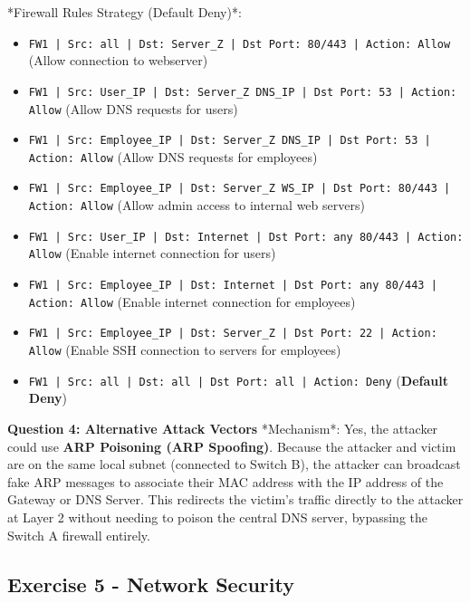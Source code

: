 \documentclass{article}
\begin{document}
*Firewall Rules Strategy (Default Deny)*:
\begin{itemize}
    \item[\textbf{1.}] \texttt{FW1 | Src: all | Dst: Server\_Z | Dst Port: 80/443 | Action: Allow} (Allow connection to webserver)
    \item[\textbf{2.}] \texttt{FW1 | Src: User\_IP | Dst: Server\_Z DNS\_IP | Dst Port: 53 | Action: Allow} (Allow DNS requests for users)
    \item[\textbf{3.}] \texttt{FW1 | Src: Employee\_IP | Dst: Server\_Z DNS\_IP | Dst Port: 53 | Action: Allow} (Allow DNS requests for employees)
    \item[\textbf{4.}] \texttt{FW1 | Src: Employee\_IP | Dst: Server\_Z WS\_IP | Dst Port: 80/443 | Action: Allow} (Allow admin access to internal web servers)
    \item[\textbf{5.}] \texttt{FW1 | Src: User\_IP | Dst: Internet | Dst Port: any 80/443 | Action: Allow} (Enable internet connection for users)
    \item[\textbf{6.}] \texttt{FW1 | Src: Employee\_IP | Dst: Internet | Dst Port: any 80/443 | Action: Allow} (Enable internet connection for employees)
    \item[\textbf{7.}] \texttt{FW1 | Src: Employee\_IP | Dst: Server\_Z | Dst Port: 22 | Action: Allow} (Enable SSH connection to servers for employees)
    \item[\textbf{8.}] \texttt{FW1 | Src: all | Dst: all | Dst Port: all | Action: Deny} (\textbf{Default Deny})

\end{itemize}
\textbf{Question 4: Alternative Attack Vectors}
*Mechanism*: Yes, the attacker could use \textbf{ARP Poisoning (ARP Spoofing)}. Because the attacker and victim are on the same local subnet (connected to Switch B), the attacker can broadcast fake ARP messages to associate their MAC address with the IP address of the Gateway or DNS Server. This redirects the victim's traffic directly to the attacker at Layer 2 without needing to poison the central DNS server, bypassing the Switch A firewall entirely.

\subsection{Exercise 5 - Network Security}
\end{document}
